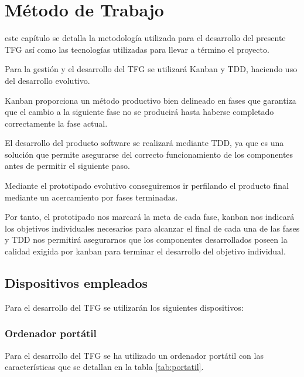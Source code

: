 \chapter{Método de Trabajo}
\label{chap:metodo}

 este capítulo se detalla la metodología utilizada para el desarrollo del presente \ac{TFG} así como las tecnologías utilizadas para llevar a término el proyecto.

Para la gestión y el desarrollo del \ac{TFG} se utilizará Kanban y \ac{TDD}, haciendo uso del desarrollo evolutivo.

Kanban proporciona un método productivo bien delineado en fases que garantiza que el cambio a la siguiente fase no se producirá hasta haberse completado correctamente la fase actual.

El desarrollo del producto software se realizará mediante \ac{TDD}, ya que es una solución que permite asegurarse del correcto funcionamiento de los componentes antes de permitir el siguiente paso.

Mediante el prototipado evolutivo conseguiremos ir perfilando el producto final mediante un acercamiento por fases terminadas.

Por tanto, el prototipado nos marcará la meta de cada fase, kanban nos indicará los objetivos individuales necesarios para alcanzar el final de cada una de las fases y \ac{TDD} nos permitirá asegurarnos que los componentes desarrollados poseen la calidad exigida por kanban para terminar el desarrollo del objetivo individual.


\section{Dispositivos empleados}
Para el desarrollo del \ac{TFG} se utilizarán los siguientes dispositivos:

	\subsection{Ordenador portátil}
	
	Para el desarrollo del TFG se ha utilizado un ordenador portátil con las características que se detallan en la tabla \ref{tab:portatil}.
	
